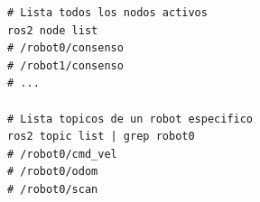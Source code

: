 {\renewcommand{\lstlistingname}{Terminal}
\begin{figure}[t]
\centering
\begin{lstlisting}[style=bash,
    caption={Inspección de nodos y tópicos con namespaces.},
    label={lst:ns_inspect}]
# Lista todos los nodos activos
ros2 node list
# /robot0/consenso
# /robot1/consenso
# ...

# Lista topicos de un robot especifico
ros2 topic list | grep robot0
# /robot0/cmd_vel
# /robot0/odom
# /robot0/scan
\end{lstlisting}
\end{figure}
}
